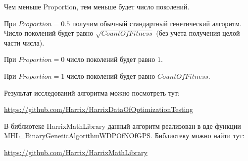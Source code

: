 Чем меньше Proportion, тем меньше будет число поколений.

При $ Proportion=0.5 $ получим обычный стандартный генетический алгоритм. Число поколений будет равно $ \sqrt{CountOfFitness}$ (без учета получения целой части числа).

При $ Proportion=0 $ число поколений будет равно $ 1 $.

При $ Proportion=1 $ число поколений будет равно $ CountOfFitness $.

Результат исследований алгоритма можно посмотреть тут:

\href{https://github.com/Harrix/HarrixDataOfOptimizationTesting}{https://github.com/Harrix/HarrixDataOfOptimizationTesting}

В библиотеке HarrixMathLibrary данный алгоритм реализован в вде функции MHL\_BinaryGeneticAlgorithmWDPOfNOfGPS. Библиотеку можно найти тут:

\href{https://github.com/Harrix/HarrixMathLibrary}{https://github.com/Harrix/HarrixMathLibrary}